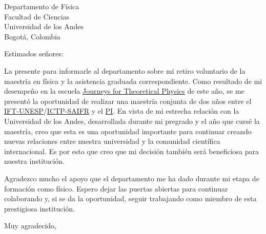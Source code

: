 \documentclass{letter}
\begin{document}
\begin{letter}{Departamento de Física \\ Facultad de Ciencias \\ Universidad de los Andes \\ Bogotá, Colombia}

\opening{Estimados señores:}

La presente para informarle al departamento sobre mi retiro voluntario de la maestría en física y la asistencia graduada correspondiente. Como resultado de mi desempeño en la escuela \href{http://journeys.ictp-saifr.org/}{Journeys for Theoretical Physics} de este año, se me presentó la oportunidad de realizar una maestría conjunta de dos años entre el \href{http://www.ift.unesp.br/br/}{IFT-UNESP}/\href{http://www.ictp-saifr.org/}{ICTP-SAIFR} y el \href{https://www.perimeterinstitute.ca/}{PI}. En vista de mi estrecha relación con la Universidad de los Andes, desarrollada durante mi pregrado y el año que cursé la maestría, creo que esta es una oportunidad importante para continuar creando nuevas relaciones entre nuestra universidad y la comunidad científica internacional. Es por esto que creo que mi decisión también será beneficiosa para nuestra institución. 

Agradezco mucho el apoyo que el departamento me ha dado durante mi etapa de formación como físico. Espero dejar las puertas abiertas para continuar colaborando y, si se da la oportunidad, seguir trabajando como miembro de esta prestigiosa institución.

\closing{Muy agradecido,}

\end{letter}
\end{document}
